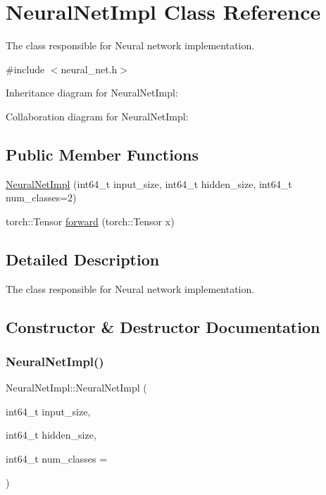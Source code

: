 \hypertarget{classNeuralNetImpl}{}\section{Neural\+Net\+Impl Class Reference}
\label{classNeuralNetImpl}


The class responsible for Neural network implementation.  




{\ttfamily \#include $<$neural\+\_\+net.\+h$>$}



Inheritance diagram for Neural\+Net\+Impl\+:


Collaboration diagram for Neural\+Net\+Impl\+:
\subsection*{Public Member Functions}
\begin{DoxyCompactItemize}
\item 
\hyperlink{classNeuralNetImpl_aaccb7e8311ba6c9647824f86dfb627bc}{Neural\+Net\+Impl} (int64\+\_\+t input\+\_\+size, int64\+\_\+t hidden\+\_\+size, int64\+\_\+t num\+\_\+classes=2)
\item 
torch\+::\+Tensor \hyperlink{classNeuralNetImpl_ae392a0bba51173dd708f8522ece17dae}{forward} (torch\+::\+Tensor x)
\end{DoxyCompactItemize}


\subsection{Detailed Description}
The class responsible for Neural network implementation. 

\subsection{Constructor \& Destructor Documentation}
\mbox{\label{classNeuralNetImpl_aaccb7e8311ba6c9647824f86dfb627bc}} 
\subsubsection{\texorpdfstring{Neural\+Net\+Impl()}{NeuralNetImpl()}}
{\footnotesize\ttfamily Neural\+Net\+Impl\+::\+Neural\+Net\+Impl (\begin{DoxyParamCaption}\item[{int64\+\_\+t}]{input\+\_\+size,  }\item[{int64\+\_\+t}]{hidden\+\_\+size,  }\item[{int64\+\_\+t}]{num\+\_\+classes = {} }\end{DoxyParamCaption})}

